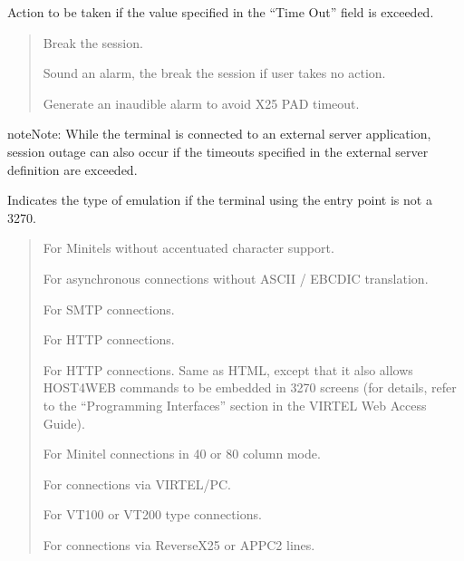 \documentclass[letterpaper,10pt,english]{sphinxmanual}
\begin{document}
\begin{description}
\sphinxAtStartPar
Action to be taken if the value specified in the “Time Out” field is exceeded.
\begin{quote}
\begin{description}
\sphinxAtStartPar
Break the session.

\sphinxAtStartPar
Sound an alarm, the break the session if user takes no action.

\sphinxAtStartPar
Generate an inaudible alarm to avoid X25 PAD timeout.

\end{description}
\end{quote}

\begin{sphinxadmonition}{note}{Note:}
\sphinxAtStartPar
While the terminal is connected to an external server application, session outage can also occur if the timeouts specified in the external server definition are exceeded.
\end{sphinxadmonition}

\sphinxAtStartPar
Indicates the type of emulation if the terminal using the entry point is not a 3270.
\begin{quote}
\begin{description}
\sphinxAtStartPar
For Minitels without accentuated character support.

\sphinxAtStartPar
For asynchronous connections without ASCII / EBCDIC translation.

\sphinxAtStartPar
For SMTP connections.

\sphinxAtStartPar
For HTTP connections.

\sphinxAtStartPar
For HTTP connections. Same as HTML, except that it also allows HOST4WEB commands to be embedded in 3270 screens (for details, refer to the “Programming Interfaces” section in the VIRTEL Web Access Guide).

\sphinxAtStartPar
For Minitel connections in 40 or 80 column mode.

\sphinxAtStartPar
For connections via VIRTEL/PC.

\sphinxAtStartPar
For VT100 or VT200 type connections.

\sphinxAtStartPar
For connections via Reverse\sphinxhyphen{}X25 or APPC2 lines.


\end{description}
\end{quote}
\end{description}
\end{document}
